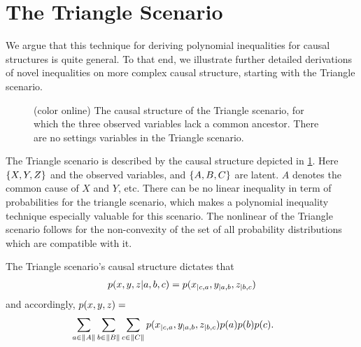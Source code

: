 \section{The Triangle Scenario}

We argue that this technique for deriving polynomial inequalities for causal structures is quite general. To that end, we illustrate further detailed derivations of novel inequalities on more complex causal structure, starting with the Triangle scenario.

\begin{figure}[!t]
\caption{(color online) The causal structure of the Triangle scenario, for which the three observed variables lack a common ancestor. There are no settings variables in the Triangle scenario.}
 \label{fig:TriDAG}
\end{figure}

The Triangle scenario is described by the causal structure depicted in \cref{fig:TriDAG}. Here $\left\lbrace X,Y,Z\right\rbrace$ and the observed variables, and  $\left\lbrace A,B,C\right\rbrace$ are latent. $A$ denotes the common cause of $X$ and $Y$, etc.  There can be no linear inequality in term of probabilities for the triangle scenario, which makes a polynomial inequality technique especially valuable for this scenario. The nonlinear of the Triangle scenario follows for the non-convexity of the set of all probability distributions which are compatible with it. 

The Triangle scenario's causal structure dictates that
\begin{align}\begin{split}\label{eq:tristructure}
p\lparen x,y,z|a,b,c\rparen=p\lparen x_{|c,a} , y_{|a,b} , z_{|b,c}\rparen
\end{split}\end{align}
and accordingly, $p\lparen x,y,z\rparen=$
\begin{align}\label{eq:triintegration}
&\hspace{-2ex}\sum\limits_{a\in \norm{A}} \sum\limits_{b\in \norm{B}} \sum\limits_{c\in \norm{C}} \p{x_{|c,a} , y_{|a,b} , z_{|b,c}}\p{a}\p{b}\p{c}.
\end{align}

